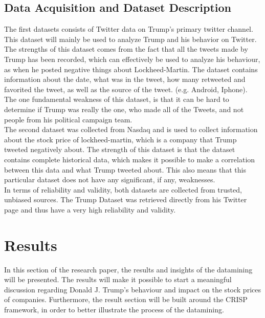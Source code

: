 \documentclass[12pt]{article}
\begin{document}



\subsection{Data Acquisition and Dataset Description}
The first datasets consists of Twitter data on Trump's primary twitter channel.  This dataset will mainly be used to analyze Trump and his behavior on Twitter. The strengths of this dataset comes from the fact that all the tweets made by Trump has been recorded, which can effectively be used to analyze his behaviour, as when he posted negative things about Lockheed-Martin. The dataset contains information about the date, what was in the tweet, how many retweeted and favorited the tweet, as well as the source of the tweet. (e.g. Android, Iphone). The one fundamental weakness of this dataset, is that it can be hard to determine if Trump was really the one, who made all of the Tweets, and not people from his political campaign team.\\

The second dataset was collected from Nasdaq and is used to collect information about the stock price of lockheed-martin, which is a company that Trump tweeted negatively about. The strength of this dataset is that the dataset contains complete historical data, which makes it possible to make a correlation between this data and what Trump tweeted about. This also means that this particular dataset does not have any significant, if any, weaknesses.\\

In terms of reliability and validity, both datasets are collected from trusted, unbiased sources. The Trump Dataset was retrieved directly from his Twitter page and thus have a very high reliability and validity. 

\section{Results}
In this section of the research paper, the results and insights of the datamining will be presented. The results will make it possible to start a meaningful discussion regarding Donald J. Trump's behaviour and impact on the stock prices of companies. Furthermore, the result section will be built around the CRISP framework, in order to better illustrate the process of the datamining.
\end{document}
